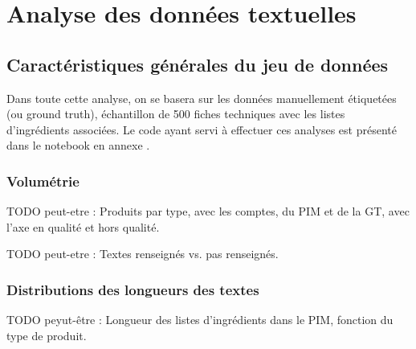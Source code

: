 \part{Analyse des données textuelles}

    \chapter{Caractéristiques générales du jeu de données}

        Dans toute cette analyse, on se basera sur les données manuellement étiquetées (ou ground truth), échantillon de 500 fiches techniques avec les listes d'ingrédients associées.
        Le code ayant servi à effectuer ces analyses est présenté dans le notebook en annexe .

        \section{Volumétrie}

        TODO peut-etre : Produits par type, avec les comptes, du PIM et de la GT, avec l'axe en qualité et hors qualité.

        TODO peut-etre : Textes renseignés vs. pas renseignés.



        \section{Distributions des longueurs des textes}

        TODO peyut-être : Longueur des listes d'ingrédients dans le PIM, fonction du type de produit.

